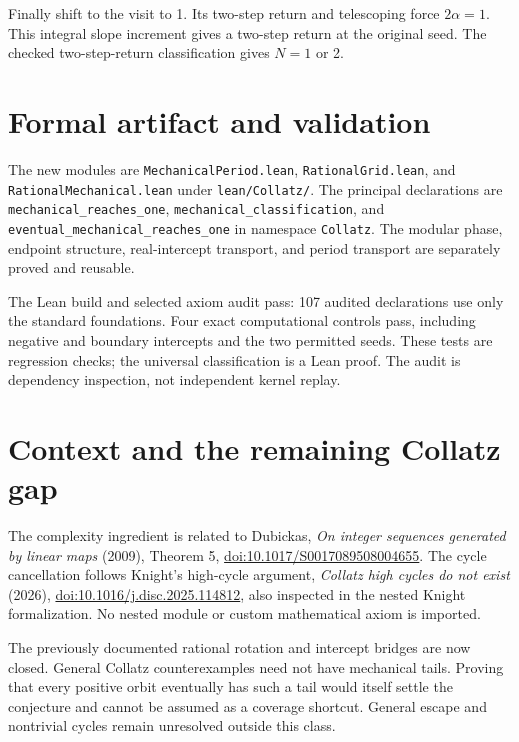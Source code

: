 \documentclass[10pt]{article}
\begin{document}
Finally shift to the visit to 1. Its two-step return and telescoping force
$2\alpha=1$. This integral slope increment gives a two-step return at the
original seed. The checked two-step-return classification gives $N=1$ or 2.

\section{Formal artifact and validation}
The new modules are \texttt{MechanicalPeriod.lean},
\texttt{RationalGrid.lean}, and \texttt{RationalMechanical.lean} under
\texttt{lean/Collatz/}. The principal declarations are
\texttt{mechanical\_reaches\_one}, \texttt{mechanical\_classification}, and
\texttt{eventual\_mechanical\_reaches\_one} in namespace \texttt{Collatz}.
The modular phase, endpoint structure, real-intercept transport, and period
transport are separately proved and reusable.

The Lean build and selected axiom audit pass: 107 audited declarations
use only the standard foundations. Four exact computational controls pass,
including negative and boundary intercepts and the two permitted seeds.
These tests are regression checks; the universal classification is a Lean
proof. The audit is dependency inspection, not independent kernel replay.

\section{Context and the remaining Collatz gap}
The complexity ingredient is related to Dubickas,
\emph{On integer sequences generated by linear maps} (2009), Theorem 5,
\href{https://doi.org/10.1017/S0017089508004655}{doi:10.1017/S0017089508004655}.
The cycle cancellation follows Knight's high-cycle argument,
\emph{Collatz high cycles do not exist} (2026),
\href{https://doi.org/10.1016/j.disc.2025.114812}{doi:10.1016/j.disc.2025.114812},
also inspected in the nested Knight formalization. No nested module or
custom mathematical axiom is imported.

The previously documented rational rotation and intercept bridges are now
closed. General Collatz counterexamples need not have mechanical tails.
Proving that every positive orbit eventually has such a tail would itself
settle the conjecture and cannot be assumed as a coverage shortcut.
General escape and nontrivial cycles remain unresolved outside this class.
\end{document}
